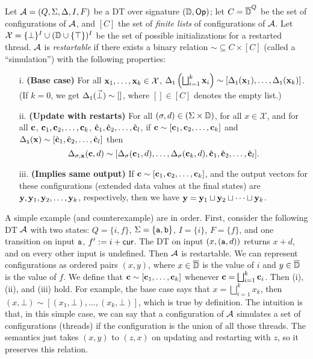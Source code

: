 \begin{definition}[Restartability]
\label{dt:definition:restartability}
Let $\mathcal{A} = (Q, \Sigma, \Delta, I, F)$ be a DT over signature $(\mathbb{D}, \textsf{Op})$;
let $C = \overline{\mathbb{D}{}}^Q$ be the set of configurations of $\mathcal{A}$, and
$[C]$ the set of \emph{finite lists} of configurations of $\mathcal{A}$.
Let $\mathcal{X} = \{\bot\}^I \cup (\mathbb{D} \cup \{\top\})^I$ be the set of possible initializations for a restarted thread.
$\mathcal{A}$ is \emph{restartable} if there exists a binary relation $\sim \subseteq C \times [C]$
(called a ``simulation'') with the following properties:
\begin{enumerate}
\item[i.] \textbf{(Base case)}
  For all $\mathbf{x}_1, \ldots, \mathbf{x}_k \in \mathcal{X}$,
  $\Delta_{{\texttt{i}}}\left(\bigsqcup_{i=1}^k \mathbf{x}_i\right) \sim [\Delta_{{\texttt{i}}}(\mathbf{x}_1),\ldots,\Delta_{{\texttt{i}}}(\mathbf{x}_k)]$. (If $k = 0$, we get $\Delta_{{\texttt{i}}}(\vec{\bot}) \sim []$, where $[] \in [C]$ denotes the empty list.)
\item[ii.]
  \textbf{(Update with restarts)} For all $(\sigma, d) \in (\Sigma \times \mathbb{D})$,
  for all $x \in \mathcal{X}$,
  and for all $\mathbf{c}$, $\mathbf{c}_1, \mathbf{c}_2, \ldots, \mathbf{c}_k$, $\hat{\mathbf{c}}_1, \hat{\mathbf{c}}_2, \ldots, \hat{\mathbf{c}}_l$,
  if $\mathbf{c} \sim [\mathbf{c}_1, \mathbf{c}_2, \ldots, \mathbf{c}_k]$
  and $\Delta_{{\texttt{i}}}(\mathbf{x}) \sim [\hat{\mathbf{c}}_1, \hat{\mathbf{c}}_2, \ldots, \hat{\mathbf{c}}_l]$
  then
  \[\Delta_{\sigma,\mathbf{x}}(\mathbf{c},d) \sim [\Delta_{\sigma}(\mathbf{c}_1,d), \ldots, \Delta_{\sigma}(\mathbf{c}_k,d), \hat{\mathbf{c}}_1, \hat{\mathbf{c}}_2, \ldots, \hat{\mathbf{c}}_l].\]
\item[iii.]
  \textbf{(Implies same output)}
  If $\mathbf{c} \sim [\mathbf{c}_1, \mathbf{c}_2, \ldots, \mathbf{c}_k]$,
  and the output vectors for these configurations (extended data values at the final states) are $\mathbf{y}, \mathbf{y}_1, \mathbf{y}_2, \ldots, \mathbf{y}_k$, respectively, then we have $\mathbf{y} = \mathbf{y}_1 \sqcup \mathbf{y}_2 \sqcup \cdots \sqcup \mathbf{y}_k$.
\end{enumerate}
\end{definition}

A simple example (and counterexample) are in order. First, consider the following DT $\mathcal{A}$ with two states: $Q = \{i,f\}$, $\Sigma = \{{\texttt{a}},{\texttt{b}}\}$, $I = \{i\}$, $F = \{f\}$, and one transition on input ${\texttt{a}}$, $f' := i + \mathsf{cur}$. The DT on input $(x,({\texttt{a}},d))$ returns $x + d$, and on every other input is undefined. Then $\mathcal{A}$ is restartable. We can represent configurations as ordered pairs $(x,y)$, where $x \in \overline{\mathbb{D}{}}$ is the value of $i$ and $y \in \overline{\mathbb{D}{}}$ is the value of $f$. We define that $\mathbf{c} \sim [\mathbf{c}_1, \ldots, \mathbf{c}_k]$ whenever $\mathbf{c} = \bigsqcup_{i=1}^k \mathbf{c}_i$. Then (i), (ii), and (iii) hold. For example, the base case says that $x = \bigsqcup_{i=1}^k x_k$, then $(x,\bot) \sim [(x_1,\bot), \ldots, (x_k,\bot)]$, which is true by definition.
The intuition is that, in this simple case, we can say that a configuration of $\mathcal{A}$ simulates a set of configurations (threads) if the configuration is the union of all those threads. The semantics just takes $(x,y)$ to $(z,x)$ on updating and restarting with $z$, so it preserves this relation.

